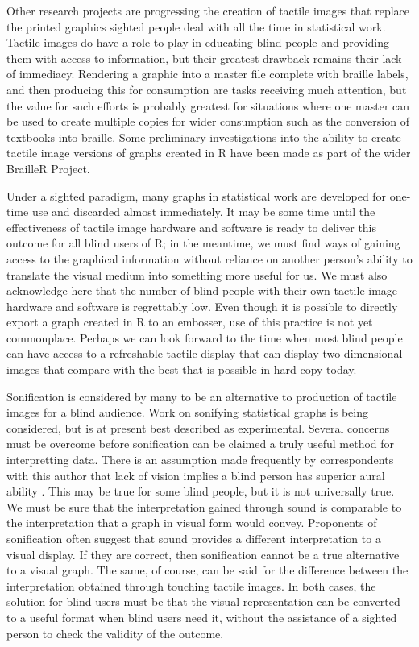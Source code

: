 \documentclass[
]{book}
\begin{document}
Other research projects are progressing the creation of tactile images that replace the printed graphics sighted people deal with all the time in statistical work. Tactile images do have a role to play in educating blind people and providing them with access to information, but their greatest drawback remains their lack of immediacy. Rendering a graphic into a master file complete with braille labels, and then producing this for consumption are tasks receiving much attention, but the value for such efforts is probably greatest for situations where one master can be used to create multiple copies for wider consumption such as the conversion of textbooks into braille. Some preliminary investigations into the ability to create tactile image versions of graphs created in R have been made as part of the wider BrailleR Project.

Under a sighted paradigm, many graphs in statistical work are developed for one-time use and discarded almost immediately.
It may be some time until the effectiveness of tactile image hardware and software is ready to deliver this outcome for all blind users of R; in the meantime, we must find ways of gaining access to the graphical information without reliance on another person's ability to translate the visual medium into something more useful for us. We must also acknowledge here that the number of blind people with their own tactile image hardware and software is regrettably low. Even though it is possible to directly export a graph created in R to an embosser, use of this practice is not yet commonplace.
Perhaps we can look forward to the time when most blind people can have access to a refreshable tactile display that can display two-dimensional images that compare with the best that is possible in hard copy today.

Sonification is considered by many to be an alternative to production of tactile images for a blind audience. Work on sonifying statistical graphs is being considered, but is at present best described as experimental. Several concerns must be overcome before sonification can be claimed a truly useful method for interpretting data. There is an assumption made frequently by correspondents with this author that lack of vision implies a blind person has superior aural ability . This may be true for some blind people, but it is not universally true. We must be sure that the interpretation gained through sound is comparable to the interpretation that a graph in visual form would convey. Proponents of sonification often suggest that sound provides a different interpretation to a visual display. If they are correct, then sonification cannot be a true alternative to a visual graph. The same, of course, can be said for the difference between the interpretation obtained through touching tactile images. In both cases, the solution for blind users must be that the visual representation can be converted to a useful format when blind users need it, without the assistance of a sighted person to check the validity of the outcome.
\end{document}
